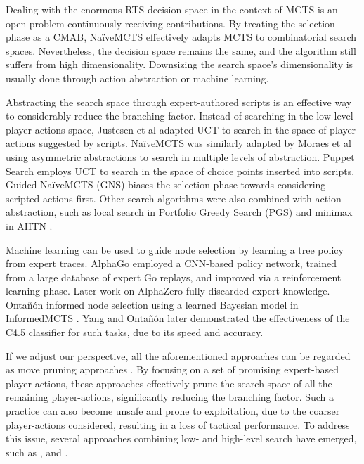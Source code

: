 \documentclass[conference]{IEEEtran}
\begin{document}
Dealing with the enormous RTS decision space in the context of MCTS is an open problem continuously receiving contributions. By treating the selection phase as a CMAB, NaïveMCTS effectively adapts MCTS to combinatorial search spaces. Nevertheless, the decision space remains the same, and the algorithm still suffers from high dimensionality. Downsizing the search space's dimensionality is usually done through action abstraction or machine learning.

Abstracting the search space through expert-authored scripts is an effective way to considerably reduce the branching factor. Instead of searching in the low-level player-actions space, Justesen et al \cite{justesen_script-_2014} adapted UCT to search in the space of player-actions suggested by scripts. NaïveMCTS was similarly adapted by Moraes et al \cite{moraes_action_2018} using asymmetric abstractions \cite{moraes_asymmetric_2018} to search in multiple levels of abstraction. Puppet Search \cite{barriga_puppet_2015} employs UCT to search in the space of choice points inserted into scripts. Guided NaïveMCTS (GNS) \cite{yang_guiding_2019} biases the selection phase towards considering scripted actions first. Other search algorithms were also combined with action abstraction, such as local search in Portfolio Greedy Search (PGS) \cite{churchill_portfolio_2013} and minimax in AHTN \cite{ontanon_adversarial_2015}.

Machine learning can be used to guide node selection by learning a tree policy from expert traces. AlphaGo \cite{silver_mastering_2016} employed a CNN-based policy network, trained from a large database of expert Go replays, and improved via a reinforcement learning phase. Later work on AlphaZero \cite{silver_general_2018} fully discarded expert knowledge. Ontañón informed node selection using a learned Bayesian model in InformedMCTS \cite{ontanon_informed_2016}. Yang and Ontañón \cite{yang_extracting_2019} later demonstrated the effectiveness of the C4.5 classifier for such tasks, due to its speed and accuracy.


If we adjust our perspective, all the aforementioned approaches can be regarded as move pruning approaches \cite{yang_integrating_2020}. By focusing on a set of promising expert-based player-actions, these approaches effectively prune the search space of all the remaining player-actions, significantly reducing the branching factor. Such a practice can also become unsafe and prone to exploitation, due to the coarser player-actions considered, resulting in a loss of tactical performance. To address this issue, several approaches combining low- and high-level search have emerged, such as \cite{barriga_combining_2017}, \cite{neufeld_hybrid_2019} and \cite{moraes_action_2018}.
\end{document}
